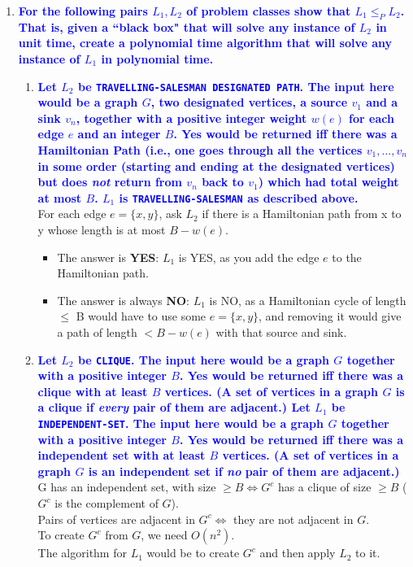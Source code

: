 \documentclass[11pt]{article}
\begin{document}
\begin{enumerate}
\item \textbf{\textcolor{blue}{For the following pairs $L_1,L_2$ of problem classes show that $L_1\leq_P L_2$.  That is, given a ``black box" that will solve any instance of $L_2$ in unit time, create a polynomial time algorithm that will solve any instance of $L_1$ in polynomial time.}}
\begin{enumerate}
    \item \textbf{\textcolor{blue}{Let $L_2$ be {\tt TRAVELLING-SALESMAN DESIGNATED PATH}. The input here would be a graph $G$, two designated vertices, a source $v_1$ and a sink $v_n$, together with a positive integer weight $w(e)$ for each edge $e$ and an integer $B$.  Yes would be returned iff there was a Hamiltonian Path (i.e., one goes through all the vertices $v_1,\ldots,v_n$ in some order (starting and ending at the designated vertices) but does {\em not} return from $v_n$ back to $v_1$) which had total weight at most $B$. $L_1$ is {\tt TRAVELLING-SALESMAN} as described above.}}
        \\ For each edge $e = \{x, y\}$, ask $L_2$ if there is a Hamiltonian path from x to y whose length is at most $B - w(e)$.
        \begin{itemize}
            \item The answer is \textbf{YES}: $L_1$ is YES, as you add the edge $e$ to the Hamiltonian path.
            \item The answer is always \textbf{NO}: $L_1$ is NO, as a Hamiltonian cycle of length $\leq$ B would have to use some $e = \{x,y\}$, and removing it would give a path of length $< B - w(e)$ with that source and sink.
        \end{itemize}
    \item \textbf{\textcolor{blue}{Let $L_2$ be {\tt CLIQUE}. The input here would be a graph $G$ together with a positive integer $B$. Yes would be returned iff there was a clique with at least $B$ vertices. (A set of vertices in a graph $G$ is a clique if {\em every} pair of them are adjacent.) Let $L_1$ be {\tt INDEPENDENT-SET}. The input here would be a graph $G$ together with a positive integer $B$. Yes would be returned iff there was a independent set with at least $B$ vertices. (A set of vertices in a graph $G$ is an independent set if {\em no} pair of them are adjacent.)}}
        \\ G has an independent set, with size $\geq B \Leftrightarrow G^c$ has a clique of size $\geq B$ ($G^c$ is the complement of $G$).
        \\ Pairs of vertices are adjacent in $G^c \Leftrightarrow$ they are not adjacent in $G$.
        \\ To create $G^c$ from $G$, we need $O(n^2)$.
        \\ The algorithm for $L_1$ would be to create $G^c$ and then apply $L_2$ to it.
\end{enumerate}


\end{enumerate}
\end{document}
